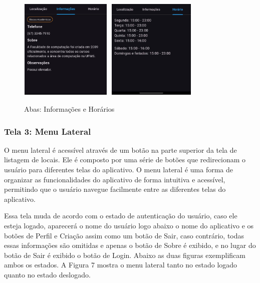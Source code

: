     \begin{figure}
        \centering
        \includegraphics[width=44mm,height=48mm]{imagens/info.jpg}
        \hspace{10mm}
        \includegraphics[width=44mm,height=48mm]{imagens/horario.jpg}
        \caption{\scriptsize Abas: Informações e Horários}
        \label{fig:tela2-abas}
    \end{figure}

    \FloatBarrier

\subsubsection{Tela 3: Menu Lateral}

    O menu lateral é acessível através de um botão na parte superior da tela de listagem de locais. Ele é composto por uma série de botões que redirecionam o usuário para diferentes telas do aplicativo. O menu lateral é uma forma de organizar as funcionalidades do aplicativo de forma intuitiva e acessível, permitindo que o usuário navegue facilmente entre as diferentes telas do aplicativo.

    Essa tela muda de acordo com o estado de autenticação do usuário, caso ele esteja logado, aparecerá o nome do usuário logo abaixo o nome do aplicativo e os botões de Perfil e Criação assim como um botão de Sair, caso contrário, todas essas informações são omitidas e apenas o botão de Sobre é exibido, e no lugar do botão de Sair é exibido o botão de Login. Abaixo as duas figuras exemplificam ambos os estados. A Figura 7 mostra o menu lateral tanto no estado logado quanto no estado deslogado.

